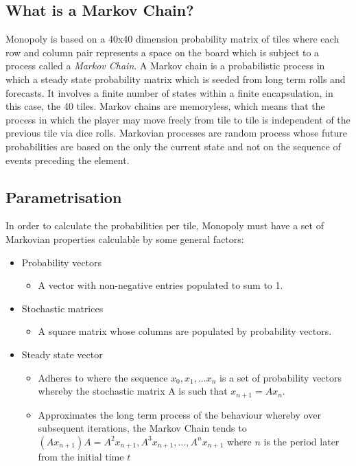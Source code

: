 \documentclass[12pt]{article}
\begin{document}
\subsection{What is a Markov Chain?}
Monopoly is based on a 40x40 dimension probability matrix of tiles where each row and column pair represents a space on the board which is subject to a process called a \emph{Markov Chain}. A Markov chain is a probabilistic process in which a steady state probability matrix which is seeded from long term rolls and forecasts. It involves a finite number of states within a finite encapsulation, in this case, the 40 tiles. Markov chains are memoryless, which means that the process in which the player may move freely from tile to tile is independent of the previous tile via dice rolls. Markovian processes are random process whose future probabilities are based on the only the current state and not on the sequence of events preceding the element.

\subsection{Parametrisation}
In order to calculate the probabilities per tile, Monopoly must have a set of Markovian properties calculable by some general factors:
\begin{itemize}
\item Probability vectors
\begin{itemize}
\item A vector with non-negative entries populated to sum to 1.
\end{itemize}
\item Stochastic matrices
\begin{itemize}
\item A square matrix whose columns are populated by probability vectors.
\end{itemize}
\item Steady state vector
\begin{itemize}
\item Adheres to where the sequence $x_0,x_1,...x_n$ is a set of probability vectors whereby the stochastic matrix A is such that $x_{n+1}=Ax_{n}$.
\item Approximates the long term process of the behaviour whereby over subsequent iterations, the Markov Chain tends to $(Ax_{n+1})A=A^2x_{n+1},A^3x_{n+1},...,A^nx_{n+1}$ where $n$ is the period later from the initial time $t$
\end{itemize}
\end{itemize}
\end{document}
